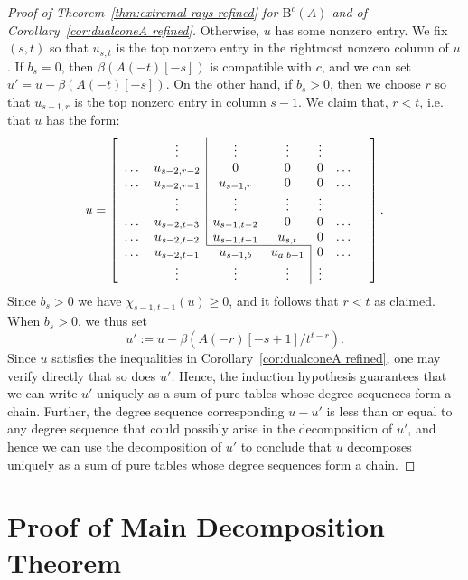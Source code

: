 \documentclass[12pt]{amsart}
\theoremstyle{definition}
\theoremstyle{remark}
\newcommand{\cc}{c}
\newcommand{\BBQ}{\mathrm{B}}
\begin{document}
\begin{proof}[Proof of Theorem~\ref{thm:extremal rays refined} for $\BBQ^{\cc}(A)$ and of Corollary~\ref{cor:dualconeA refined}]
Otherwise, $u$ has some nonzero entry.  We fix $(s,t)$ so that $u_{s,t}$ is the top nonzero entry in the rightmost nonzero column of $u$.
If $b_s=0$, then $\beta(A(-t)[-s])$ is compatible with $\cc$, and we can set $u'=u-\beta(A(-t)[-s])$.  On the other hand, if $b_s>0$, then we choose $r$ so that $u_{s-1,r}$ is the top nonzero entry in column $s-1$.  We claim that, $r<t$, i.e. that $u$ has the form:
\[
u=
\left[
\begin{array}{ccccccc}
 & \vdots& \multicolumn{1}{|c}{\vdots}&\vdots& \vdots&&\\
\dots&u_{s-2,r-2}&\multicolumn{1}{|c}{0}&0&0&\dots\\
\dots&u_{s-2,r-1}&\multicolumn{1}{|c}{u_{s-1,r}}&0&0&\dots\\
 & \vdots& \multicolumn{1}{|c}{\vdots}&\vdots& \vdots&&\\
\dots&u_{s-2,t-3}&\multicolumn{1}{|c}{u_{s-1,t-2}}&0&0&\dots\\
\dots&u_{s-2,t-2}&\multicolumn{1}{|c}{u_{s-1,t-1}}&u_{s,t}&0&\dots\\ \cline{3-4}
\dots&u_{s-2,t-1}&u_{s-1,b}&u_{a,b+1}&\multicolumn{1}{|c}{0}&\dots\\
& \vdots&\vdots&\vdots& \multicolumn{1}{|c}{\vdots}&&\\
\end{array}\right].
\]
Since $b_s>0$ we have $\chi_{s-1,t-1}(u)\geq 0$, and it follows that $r<t$ as claimed.  When $b_s>0$, we thus set
\[
u':=u-\beta(A(-r)[-s+1]/t^{t-r}).
\]
Since $u$ satisfies the inequalities in Corollary~\ref{cor:dualconeA refined}, one may verify directly that so does $u'$.  Hence, the induction hypothesis guarantees that we can write $u'$ uniquely as a sum of pure tables whose degree sequences form a chain.  Further, the degree sequence corresponding $u-u'$ is less than or equal to any degree sequence that could possibly arise in the decomposition of $u'$, and hence we can use the decomposition of $u'$ to conclude that $u$ decomposes uniquely as a sum of pure tables whose degree sequences form a chain.
\end{proof}




\section{Proof of Main Decomposition Theorem}\label{sec:refined proof}\label{sec:general case}
\end{document}
